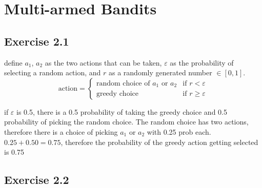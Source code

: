 \section{Multi-armed Bandits}

\subsection{Exercise 2.1}
define $a_1$, $a_2$ as the two actions that can be taken, $\varepsilon$ as the probability of selecting a random action, and $r$ as a randomly generated number $\in [0,1]$. 
\begin{equation}
    \text{action} = 
    \begin{cases}
        \text{random choice of $a_1$ or $a_2$} & \text{if } r < \varepsilon \\
        \text{greedy choice} & \text{if } r \geq \varepsilon
        \end{cases}
\end{equation}

if $\varepsilon$ is 0.5, there is a 0.5 probability of taking the greedy choice and 0.5 probability of picking the random choice. The random choice has two actions, therefore there is a choice of picking $a_1$ or $a_2$ with 0.25 prob each. $0.25 + 0.50 = 0.75$, therefore the probability of the greedy action getting selected is 0.75

\subsection{Exercise 2.2}

